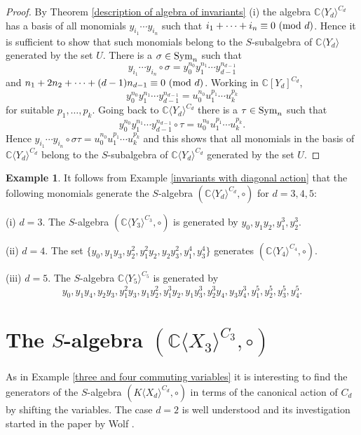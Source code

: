 \documentclass{amsart}
\theoremstyle{definition}
\newtheorem{example}[theorem]{Example}
\newcommand{\C}{{\mathbb{C}}}
\begin{document}
\begin{proof}
By Theorem \ref{description of algebra of invariants} (i) the algebra ${\mathbb C}\langle Y_d\rangle^{C_d}$ has a basis of all monomials
$y_{i_1}\cdots y_{i_n}$ such that $i_1+\cdots+i_n\equiv 0\text{ \rm (mod }d)$.
Hence it is sufficient to show that such monomials belong to the $S$-subalgebra of ${\mathbb C}\langle Y_d\rangle$ generated by the set $U$.
There is a $\sigma\in \text{\rm Sym}_n$ such that
\[
y_{i_1}\cdots y_{i_n}\circ\sigma=y_0^{n_0}y_1^{n_1}\cdots y_{d-1}^{n_{d-1}}
\]
and $n_1+2n_2+\cdots+(d-1)n_{d-1}\equiv 0\text{ \rm (mod }d)$. Working in ${\mathbb C}[Y_d]^{C_d}$,
\[
y_0^{n_0}y_1^{n_1}\cdots y_{d-1}^{n_{d-1}}=u_0^{n_0}u_1^{p_1}\cdots u_k^{p_k}
\]
for suitable $p_1,\ldots,p_k$. Going back to ${\mathbb C}\langle Y_d\rangle^{C_d}$ there is a $\tau\in \text{\rm Sym}_n$ such that
\[
y_0^{n_0}y_1^{n_1}\cdots y_{d-1}^{n_{d-1}}\circ\tau=u_0^{n_0}u_1^{p_1}\cdots u_k^{p_k}.
\]
Hence $y_{i_1}\cdots y_{i_n}\circ\sigma\tau=u_0^{n_0}u_1^{p_1}\cdots u_k^{p_k}$ and this shows that all monomials in the basis of
${\mathbb C}\langle Y_d\rangle^{C_d}$ belong to the $S$-subalgebra of ${\mathbb C}\langle Y_d\rangle^{C_d}$ generated by the set $U$.
\end{proof}

\begin{example}
It follows from Example \ref{invariants with diagonal action} that the following monomials generate the $S$-algebra
$({\mathbb C}\langle Y_d\rangle^{C_d},\circ)$ for $d=3,4,5$:

(i) $d=3$. The $S$-algebra $({\mathbb C}\langle Y_3\rangle^{C_3},\circ)$ is generated by $y_0,y_1y_2,y_1^3,y_2^3$.

(ii) $d=4$. The set $\{y_0, y_1y_3,y_2^2,y_1^2y_2,y_2y_3^2,y_1^4,y_3^4\}$ generates $({\mathbb C}\langle Y_4\rangle^{C_4},\circ)$.

(iii) $d=5$. The $S$-algebra ${\mathbb C}\langle Y_5\rangle^{C_5}$ is generated by
\[
y_0,y_1y_4,y_2y_3,y_1^2y_3,y_1y_2^2,y_1^3y_2,y_1y_3^3,y_2^3y_4,y_3y_4^3,y_1^5,y_2^5,y_3^5,y_4^5.
\]
\end{example}

\section{\textbf{The $S$-algebra} $(\C \langle X_3 \rangle^{C_3},\circ)$}
As in Example \ref{three and four commuting variables} it is interesting to find the generators of the $S$-algebra
$(K\langle X_d\rangle^{C_d},\circ)$ in terms of the canonical action of $C_d$ by shifting the variables.
The case $d=2$ is well understood and its investigation started in the paper by Wolf \cite{Wo}.
\end{document}
